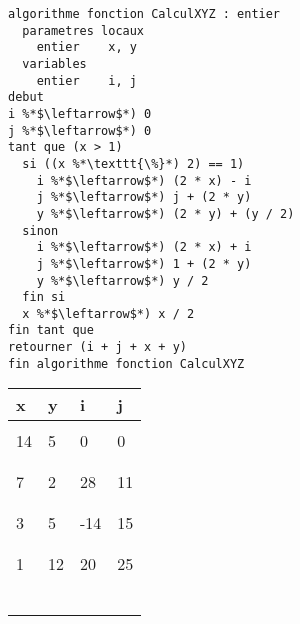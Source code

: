 \documentclass[11pt,a4paper]{article}
\begin{document}
\begin{table}[h!]
  \centering
  \begin{minipage}{0.59\textwidth}
    \centering
\begin{lstlisting}[style=algorithmique]
algorithme fonction CalculXYZ : entier
  parametres locaux
    entier    x, y
  variables
    entier    i, j
debut
i %*$\leftarrow$*) 0
j %*$\leftarrow$*) 0
tant que (x > 1)
  si ((x %*\texttt{\%}*) 2) == 1)
    i %*$\leftarrow$*) (2 * x) - i
    j %*$\leftarrow$*) j + (2 * y)
    y %*$\leftarrow$*) (2 * y) + (y / 2)
  sinon
    i %*$\leftarrow$*) (2 * x) + i
    j %*$\leftarrow$*) 1 + (2 * y)
    y %*$\leftarrow$*) y / 2
  fin si
  x %*$\leftarrow$*) x / 2
fin tant que
retourner (i + j + x + y)
fin algorithme fonction CalculXYZ \end{lstlisting}
  \end{minipage}
  \hfillx
  \begin{minipage}{0.4\textwidth}
    \centering
    \begin{tabular}{| C{1cm} | C{1cm} | C{1cm} | C{1cm} |}
        \hline
          x  &  y  &  i  &  j    \\
        \hline
             &     &     &       \\
         14  &  5  &  0  &   0   \\
             &     &     &       \\
        \hline
             &     &     &       \\
          7  &  2  &  28 &  11   \\
             &     &     &       \\
        \hline
             &     &     &       \\
          3  &  5  & -14 &  15   \\
             &     &     &       \\
        \hline
             &     &     &       \\
          1  &  12 & 20  &  25   \\
             &     &     &       \\
        \hline
             &     &     &       \\
             &     &     &       \\
             &     &     &       \\
        \hline
             &     &     &       \\
             &     &     &       \\

\end{tabular}
\end{minipage}
\end{table}
\end{document}
